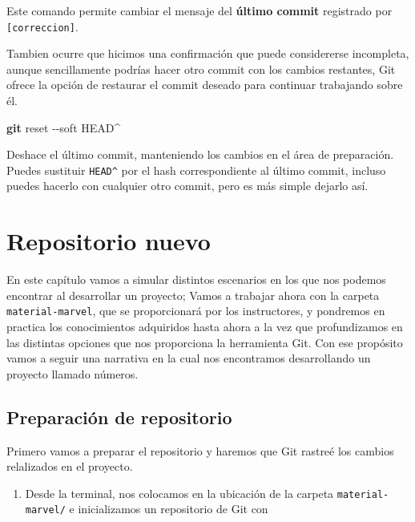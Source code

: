\documentclass[
]{book}
\newenvironment{Shaded}{\begin{snugshade}}{\end{snugshade}}
\newcommand{\AttributeTok}[1]{\textcolor[rgb]{0.13,0.29,0.53}{#1}}
\newcommand{\FunctionTok}[1]{\textcolor[rgb]{0.13,0.29,0.53}{\textbf{#1}}}
\newcommand{\NormalTok}[1]{#1}
\providecommand{\tightlist}{%
  \setlength{\itemsep}{0pt}\setlength{\parskip}{0pt}}
\begin{document}
Este comando permite cambiar el mensaje del \textbf{último commit} registrado por \texttt{{[}correccion{]}}.

Tambien ocurre que hicimos una confirmación que puede considererse incompleta, aunque sencillamente podrías hacer otro commit con los cambios restantes, Git ofrece la opción de restaurar el commit deseado para continuar trabajando sobre él.

\begin{Shaded}
\begin{Highlighting}[]
\FunctionTok{git}\NormalTok{ reset }\AttributeTok{{-}{-}soft}\NormalTok{ HEAD\^{}}
\end{Highlighting}
\end{Shaded}

Deshace el último commit, manteniendo los cambios en el área de preparación.
Puedes sustituir \texttt{HEAD\^{}} por el hash correspondiente al último commit, incluso puedes hacerlo con cualquier otro commit, pero es más simple dejarlo así.

\chapter{Repositorio nuevo}\label{repositorio-nuevo}

En este capítulo vamos a simular distintos escenarios en los que nos podemos encontrar al desarrollar un proyecto;
Vamos a trabajar ahora con la carpeta \texttt{material-marvel}, que se proporcionará por los instructores, y pondremos en practica los conocimientos adquiridos hasta ahora a la vez que profundizamos en las distintas opciones que nos proporciona la herramienta Git.
Con ese propósito vamos a seguir una narrativa en la cual nos encontramos desarrollando un proyecto llamado números.

\section{Preparación de repositorio}\label{preparaciuxf3n-de-repositorio}

Primero vamos a preparar el repositorio y haremos que Git rastreé los cambios relalizados en el proyecto.

\begin{enumerate}
\def\labelenumi{\arabic{enumi}.}
\tightlist
\item
  Desde la terminal, nos colocamos en la ubicación de la carpeta \texttt{material-marvel/} e inicializamos un repositorio de Git con
\end{enumerate}
\end{document}

